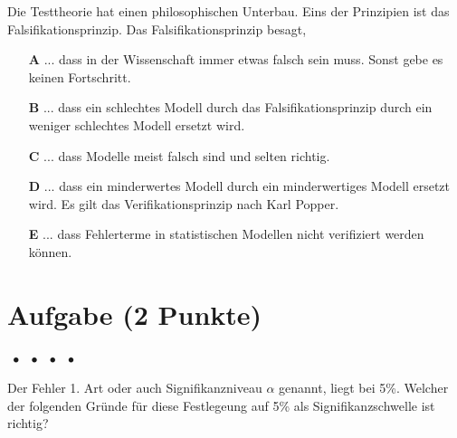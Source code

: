 \documentclass[a4paper, 9pt]{scrartcl}\usepackage[]{graphicx}\usepackage[]{xcolor}
\begin{document}
Die Testtheorie hat einen philosophischen Unterbau. Eins der Prinzipien ist das Falsifikationsprinzip. Das Falsifikationsprinzip besagt,



\begin{enumerate}
\item [\textbf{A} \msquare] ... dass in der Wissenschaft immer etwas falsch sein muss. Sonst gebe es keinen Fortschritt.
\item [\textbf{B} \msquare] ... dass ein schlechtes Modell durch das Falsifikationsprinzip durch ein weniger schlechtes Modell ersetzt wird.
\item [\textbf{C} \msquare] ... dass Modelle meist falsch sind und selten richtig.
\item [\textbf{D} \msquare] ... dass ein minderwertes Modell durch ein minderwertiges Modell ersetzt wird. Es gilt das Verifikationsprinzip nach Karl Popper.
\item [\textbf{E} \msquare] ... dass Fehlerterme in statistischen Modellen nicht verifiziert werden können.
\end{enumerate} 

\section{Aufgabe \hfill (2 Punkte)}

\ifcollection
\begin{flushright}
\tiny\vspace{-2Ex}
\textbf{\examinhaltstart}
\exammodulemathstat $\;\bullet$
\exammodulestat $\;\bullet$
\exammodulestatbbv $\;\bullet$
\exammodulestatversuch $\;\bullet$
\exammodulebiostat
\vspace{-1Ex}
\end{flushright}
\fi




Der Fehler 1. Art oder auch Signifikanzniveau $\alpha$ genannt, liegt bei
5\%. Welcher der folgenden Gründe für diese Festlegeung auf 5\% als Signifikanzschwelle ist richtig?
\end{document}
